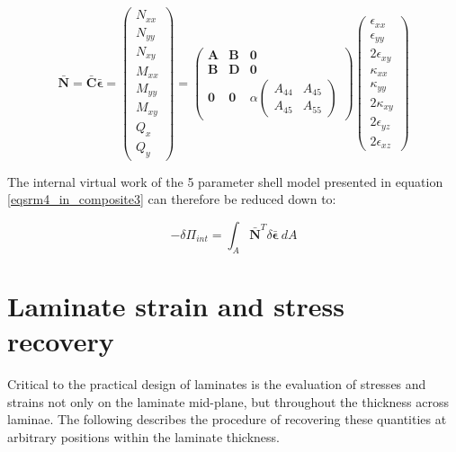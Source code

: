 \begin{equation} 
\bar{\mathbf{N}} = \bar{\mathbf{C}} \bar{\boldsymbol{\epsilon}} =
\begin{pmatrix}
N_{xx} \\
N_{yy} \\
N_{xy} \\
M_{xx} \\
M_{yy} \\
M_{xy} \\
Q_{x} \\
Q_{y} 
\end{pmatrix} 
=
\begin{pmatrix}
\mathbf{A} & \mathbf{B} & \mathbf{0} \\
\mathbf{B} & \mathbf{D} & \mathbf{0} \\
\mathbf{0}& \mathbf{0} & \alpha		\begin{pmatrix}
								{A}_{44} & {A}_{45} \\
 								{A}_{45} & {A}_{55} 
 								\end{pmatrix} 
\end{pmatrix} 
\begin{pmatrix}
\epsilon_{xx} \\
\epsilon_{yy} \\
2\epsilon_{xy}\\
\kappa_{xx}\\
\kappa_{yy}\\
2\kappa_{xy} \\
2\epsilon_{yz} \\
2\epsilon_{xz}
\end{pmatrix}
\label{eqscomp_laminate_constitutive7}
\end{equation}

The internal virtual work of the 5 parameter shell model presented in equation \ref{eqsrm4_in_composite3} can therefore be reduced down to: 

\begin{equation} 
-\delta\Pi_{int} =
\int_A
\bar{\mathbf{N}}^T
\delta \bar{\boldsymbol{\epsilon}}
\ dA
\label{eqscomp_laminate_constitutive8}
\end{equation}

\section{Laminate strain and stress recovery}
\label{Laminate strain and stress recovery}

Critical to the practical design of laminates is the evaluation of stresses and strains not only on the laminate mid-plane, but throughout the thickness across laminae. The following describes the procedure of recovering these quantities at arbitrary positions within the laminate thickness.

